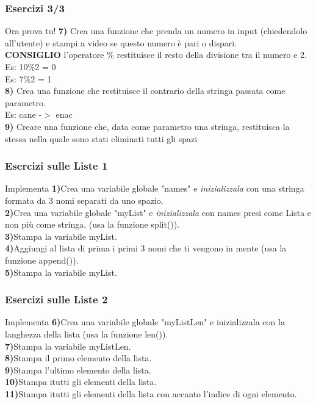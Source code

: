 \documentclass{beamer}
\begin{document}
\begin{frame}[fragile]
\frametitle{Esercizi 3/3}
\begin{block}{Ora prova tu!}
	\textbf{7)}  Crea una funzione che prenda un numero in input (chiedendolo all'utente) e stampi a video se questo numero è pari o dispari.\\
	\textbf{CONSIGLIO} l'operatore \% restituisce il resto della divisione tra il numero e 2.\\
	Es: 10\%2 = 0\\
	Es: 7\%2 = 1\\
	\textbf{8)} Crea una funzione che restituisce il contrario della stringa passata come parametro.\\
	Es: cane -$>$ enac\\
	\textbf{9)} Creare una funzione che, data come parametro una stringa, restituisca la stessa nella quale sono stati eliminati tutti gli spazi\\
\end{block}
\end{frame}





\begin{frame}[fragile]
\frametitle{Esercizi sulle Liste 1}
\begin{block}{Implementa}
  \textbf{1)}Crea una variabile globale "names" e \textit{inizializzala} con una stringa formata da 3 nomi separati da uno spazio. \\
	\textbf{2)}Crea una variabile globale "myList" e \textit{inizializzala} con names presi come Lista e non più come stringa. (usa la funzione split()). \\
  \textbf{3)}Stampa la variabile myList. \\
	\textbf{4)}Aggiungi al lista di prima i primi 3 nomi che ti vengono in mente (usa la funzione append()).\\
  \textbf{5)}Stampa la variabile myList. \\

\end{block}
\end{frame}

\begin{frame}[fragile]
\frametitle{Esercizi sulle Liste 2}
\begin{block}{Implementa}
	\textbf{6)}Crea una variabile globale "myListLen" e inizializzala con la langhezza della lista (usa la funzione len()). \\
  \textbf{7)}Stampa la variabile myListLen.\\
  \textbf{8)}Stampa il primo elemento della lista.\\
  \textbf{9)}Stampa l'ultimo elemento della lista.\\
  \textbf{10)}Stampa itutti gli elementi della lista.\\
  \textbf{11)}Stampa itutti gli elementi della lista con accanto l'indice di ogni elemento.\\

\end{block}
\end{frame}
\end{document}
